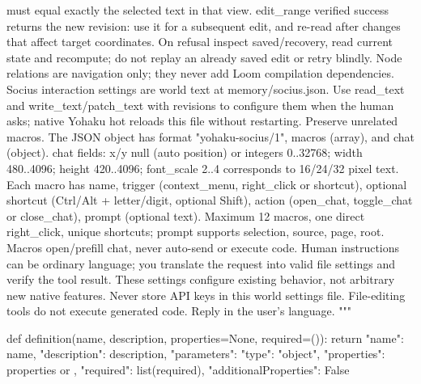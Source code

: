 must equal exactly the selected text in that view. edit_range verified success
returns the new revision: use it for a subsequent edit, and re-read after changes
that affect target coordinates. On refusal inspect saved/recovery, read current
state and recompute; do not replay an already saved edit or retry blindly.
Node relations are navigation only; they never add Loom compilation dependencies.
Socius interaction settings are world text at memory/socius.json. Use read_text
and write_text/patch_text with revisions to configure them when the human asks;
native Yohaku hot reloads this file without restarting. Preserve unrelated macros.
The JSON object has format "yohaku-socius/1", macros (array), and chat (object).
chat fields: x/y null (auto position) or integers 0..32768; width 480..4096;
height 420..4096; font_scale 2..4 corresponds to 16/24/32 pixel text.
Each macro has name, trigger (context_menu, right_click or shortcut), optional
shortcut (Ctrl/Alt + letter/digit, optional Shift), action (open_chat, toggle_chat
or close_chat), prompt (optional text). Maximum 12 macros, one direct right_click,
unique shortcuts; prompt supports {selection}, {source}, {page}, {root}.
Macros open/prefill chat, never auto-send or execute code. Human instructions can
be ordinary language; you translate the request into valid file settings and
verify the tool result. These settings configure existing behavior, not arbitrary
new native features. Never store API keys in this world settings file.
File-editing tools do not execute generated code. Reply in the user's language.
"""

def definition(name, description, properties=None, required=()):
    return {"name": name, "description": description, "parameters": {
        "type": "object", "properties": properties or {},
        "required": list(required), "additionalProperties": False}}

